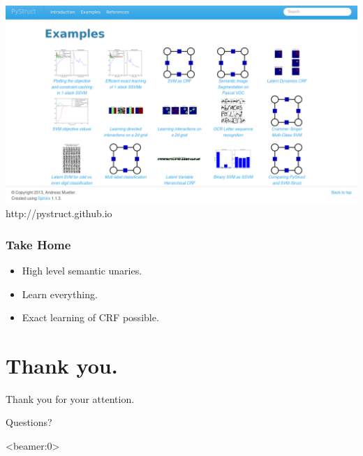 \documentclass[final,ignorenonframetext,compress]{beamer}
\begin{document}
    \begin{frame}
        \begin{center}
            \includegraphics[width=\linewidth]{images/example_gallery}\\
            http://pystruct.github.io
        \end{center}
    \end{frame}

    \begin{frame}
        \frametitle{Take Home}
        \begin{itemize}
            \item High level semantic unaries.
            \item Learn everything.
            \item Exact learning of CRF possible.
        \end{itemize}
    \end{frame}
    
    \section*{Thank you.}
    \begin{frame}
        \begin{center}
            Thank you for your attention.

            Questions?
        \end{center}
    \end{frame}
    \begin{frame}<beamer:0>
        
        
    \end{frame}

	
\end{document}
